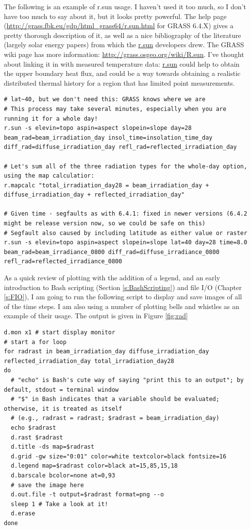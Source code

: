 \documentclass{book}
\begin{document}
The following is an example of r.sun usage. I haven't used it too much, so I don't have too much to say about it, but it looks pretty powerful. The help page (\url{http://grass.fbk.eu/gdp/html_grass64/r.sun.html} for GRASS 6.4.X) gives a pretty thorough description of it, as well as a nice bibliography of the literature (largely solar energy papers) from which the \url{r.sun} developers drew. The GRASS wiki page has more information: \url{http://grass.osgeo.org/wiki/R.sun}. I've thought about linking it in with measured temperature data: \url{r.sun} could help to obtain the upper boundary heat flux, and could be a way towards obtaining a realistic distributed thermal history for a region that has limited point measurements.

\begin{lstlisting}
# lat~40, but we don't need this: GRASS knows where we are 
# This process may take several minutes, especially when you are running it for a whole day!
r.sun -s elevin=topo aspin=aspect slopein=slope day=28 beam_rad=beam_irradiation_day insol_time=insolation_time_day diff_rad=diffuse_irradiation_day refl_rad=reflected_irradiation_day

# Let's sum all of the three radiation types for the whole-day option, using the map calculatior:
r.mapcalc "total_irradiation_day28 = beam_irradiation_day + diffuse_irradiation_day + reflected_irradiation_day"

# Given time - segfaults as with 6.4.1: fixed in newer versions (6.4.2 might be release version now, so we could be safe on this)
# Segfault also caused by including latitude as either value or raster
r.sun -s elevin=topo aspin=aspect slopein=slope lat=40 day=28 time=8.0 beam_rad=beam_irradiance_0800 diff_rad=diffuse_irradiance_0800 refl_rad=reflected_irradiance_0800
\end{lstlisting}

As a quick review of plotting with the addition of a legend, and an early introduction to Bash scripting (Section \ref{s:BashScripting}) and file I/O (Chapter \ref{s:FIO}), I am going to run the following script to display and save images of all of the time steps. I am also using a number of plotting bells and whistles as an example of their usage. The output is given in Figure \ref{fig:rad}

\begin{lstlisting}
d.mon x1 # start display monitor
# start a for loop
for radrast in beam_irradiation_day diffuse_irradiation_day reflected_irradiation_day total_irradiation_day28
do
  # "echo" is Bash's cute way of saying "print this to an output"; by default, stdout = terminal window
  # "$" in Bash indicates that a variable should be evaluated; otherwise, it is treated as itself
  # (e.g., radrast = radrast; $radrast = beam_irradiation_day)
  echo $radrast
  d.rast $radrast
  d.title -ds map=$radrast
  d.grid -gw size="0:01" color=white textcolor=black fontsize=16
  d.legend map=$radrast color=black at=15,85,15,18
  d.barscale bcolor=none at=0,93
  # save the image here
  d.out.file -t output=$radrast format=png --o
  sleep 1 # Take a look at it!
  d.erase
done
\end{lstlisting}
\end{document}
